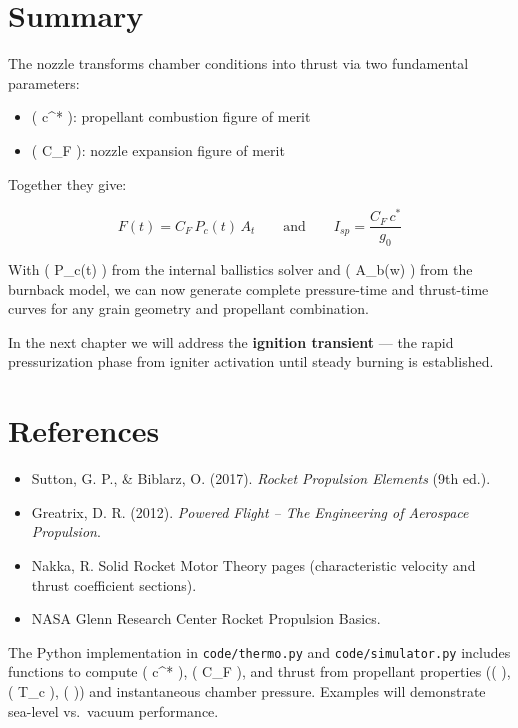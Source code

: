 \documentclass[
  letterpaper,
  DIV=11,
  numbers=noendperiod]{scrreprt}
\providecommand{\tightlist}{%
  \setlength{\itemsep}{0pt}\setlength{\parskip}{0pt}}
\begin{document}
\section{Summary}\label{summary-3}

The nozzle transforms chamber conditions into thrust via two fundamental
parameters:

\begin{itemize}
\tightlist
\item
  ( c\^{}* ): propellant combustion figure of merit
\item
  ( C\_F ): nozzle expansion figure of merit
\end{itemize}

Together they give:

\[
F(t) = C_F \, P_c(t) \, A_t \qquad \text{and} \qquad I_{sp} = \frac{C_F \, c^*}{g_0}
\]

With ( P\_c(t) ) from the internal ballistics solver and ( A\_b(w) )
from the burnback model, we can now generate complete pressure-time and
thrust-time curves for any grain geometry and propellant combination.

In the next chapter we will address the \textbf{ignition transient} ---
the rapid pressurization phase from igniter activation until steady
burning is established.

\section{References}\label{references-1}

\begin{itemize}
\tightlist
\item
  Sutton, G. P., \& Biblarz, O. (2017). \emph{Rocket Propulsion
  Elements} (9th ed.).
\item
  Greatrix, D. R. (2012). \emph{Powered Flight -- The Engineering of
  Aerospace Propulsion}.
\item
  Nakka, R. Solid Rocket Motor Theory pages (characteristic velocity and
  thrust coefficient sections).
\item
  NASA Glenn Research Center Rocket Propulsion Basics.
\end{itemize}

\begin{tcolorbox}[enhanced jigsaw, arc=.35mm, bottomrule=.15mm, bottomtitle=1mm, breakable, colback=white, colbacktitle=quarto-callout-note-color!10!white, colframe=quarto-callout-note-color-frame, coltitle=black, left=2mm, leftrule=.75mm, opacityback=0, opacitybacktitle=0.6, rightrule=.15mm, title=\textcolor{quarto-callout-note-color}{\faInfo}\hspace{0.5em}{Note}, titlerule=0mm, toprule=.15mm, toptitle=1mm]

The Python implementation in \texttt{code/thermo.py} and
\texttt{code/simulator.py} includes functions to compute ( c\^{}* ), (
C\_F ), and thrust from propellant properties (( \gamma ), ( T\_c ), (
\epsilon )) and instantaneous chamber pressure. Examples will
demonstrate sea-level vs.~vacuum performance.

\end{tcolorbox}
\end{document}
